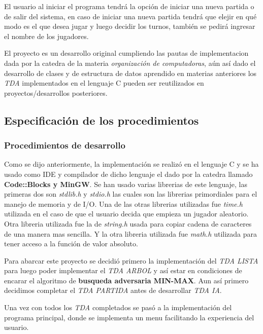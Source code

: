 \documentclass[12pt,twocolum,a4paper]{article}
\begin{document}
    El usuario al iniciar el programa tendr\'a la opci\'on de iniciar una nueva partida o de salir del sistema, en caso de iniciar una nueva partida tendr\'a que elejir en qu\'e modo es el que desea jugar y luego decidir los turnos, tambi\'en se pedir\'a ingresar el nombre de los jugadores.

    El proyecto es un desarrollo original cumpliendo las pautas de implementacion dada por la catedra de la materia {\itshape organizaci\'on de computadoras}, a\'un as\'i dado el desarrollo de clases y de estructura de datos aprendido en materias anteriores los {\itshape TDA} implementados en el lenguaje C pueden ser reutilizados en proyectos/desarrollos posteriores.

\subsection{Especificaci\'on de los procedimientos}

\subsubsection{Procedimientos de desarrollo}
    Como se dijo anteriormente, la implementaci\'on se realiz\'o en el lenguaje C y se ha usado como IDE y compilador de dicho lenguaje el dado por la catedra llamado {\bf Code::Blocks y MinGW}. Se han usado varias librerias de este lenguaje, las primeras dos son {\itshape stdlib.h} y {\itshape stdio.h} las cuales son las librerias primordiales para el manejo de memoria y de I/O. Una de las otras librerias utilizadas fue {\itshape time.h} utilizada en el caso de que el usuario decida que empieza un jugador aleatorio. Otra libreria utilizada fue la de {\itshape string.h} usada para copiar cadena de caracteres de una manera mas sencilla. Y la otra libreria utilizada fue {\itshape math.h} utilizada para tener acceso a la funci\'on de valor absoluto.

    Para abarcar este proyecto se decidi\'o primero la implementaci\'on del {\itshape TDA LISTA} para luego poder implementar el {\itshape TDA ARBOL} y as\'i estar en condiciones de encarar el algoritmo de {\bf busqueda adversaria MIN-MAX}. Aun as\'i primero decidimos completar el {\itshape TDA PARTIDA} antes de desarrollar {\itshape TDA IA}.

    Una vez con todos los {\itshape TDA} completados se pas\'o a la implementaci\'on del programa principal, donde se implementa un menu facilitando la experiencia del usuario.
\end{document}
